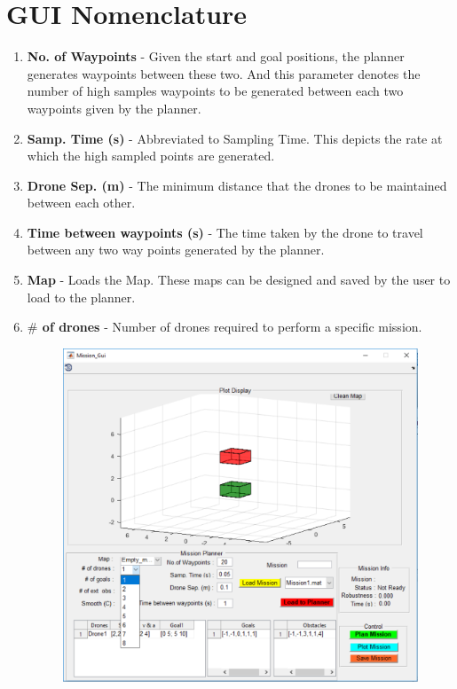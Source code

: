 \documentclass[english]{article}
\begin{document}
\section{GUI Nomenclature}
\begin{enumerate}
    \item \textbf{No. of Waypoints} - Given the start and goal positions, the planner generates waypoints between these two. And this parameter denotes the number of high samples waypoints to be generated between each two waypoints given by the planner.
    \item \textbf{Samp. Time (s)} - Abbreviated to Sampling Time. This depicts the rate at which the high sampled points are generated.
    \item \textbf{Drone Sep. (m)} - The minimum distance that the drones to be maintained between each other.
    \item \textbf{Time between waypoints (s)} - The time taken by the drone to travel between any two way points generated by the planner.
    \item \textbf{Map} - Loads the Map. These maps can be designed and saved by the user to load to the planner.
    \item \textbf{$\#$ of drones} - Number of drones required to perform a specific mission.
    \begin{figure}[H]
        \centering
        \includegraphics[scale=0.5]{drones.pdf}

\end{figure}
\end{enumerate}
\end{document}

